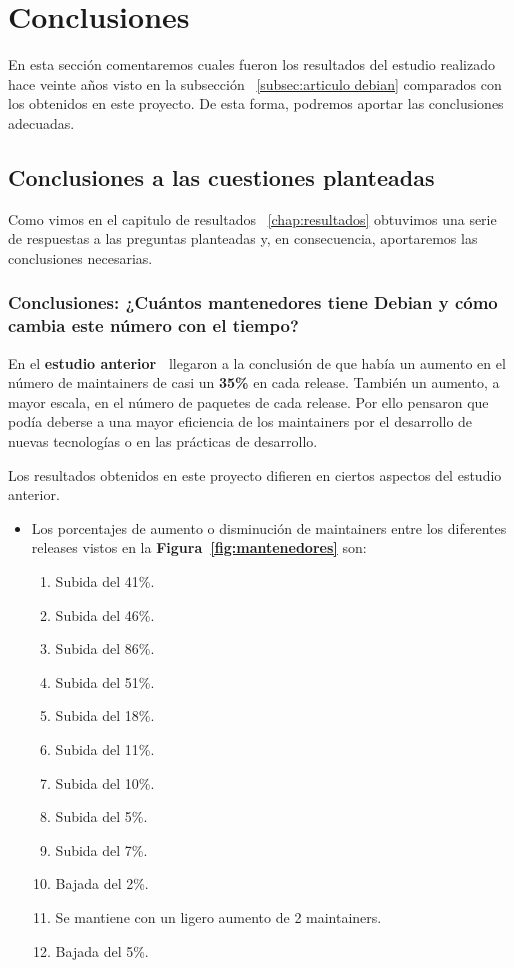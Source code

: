 \documentclass[a4paper, 12pt]{book}
\begin{document}
\cleardoublepage
\chapter{Conclusiones}
\label{chap:conclusiones}
En esta sección comentaremos cuales fueron los resultados del estudio realizado hace veinte años visto en la subsección ~\ref{subsec:articulo debian} comparados con los obtenidos en este proyecto. De esta forma, podremos aportar las conclusiones adecuadas.

\section{Conclusiones a las cuestiones planteadas}
\label{sec:conclusiones-cuestiones}
Como vimos en el capitulo de resultados ~\ref{chap:resultados} obtuvimos una serie de respuestas a las preguntas planteadas y, en consecuencia, aportaremos las conclusiones necesarias.

\subsection{Conclusiones: ¿Cuántos mantenedores tiene Debian y cómo cambia este número con el tiempo?}
\label{subsec:conclusion_1}
En el \textbf{estudio anterior~\cite{robles05:_debian}} llegaron a la conclusión de que había un aumento en el número de maintainers de casi un \textbf{35\%} en cada release. También un aumento, a mayor escala, en el número de paquetes de cada release. Por ello pensaron que podía deberse a una mayor eficiencia de los maintainers por el desarrollo de nuevas tecnologías o en las prácticas de desarrollo.

Los resultados obtenidos en este proyecto difieren en ciertos aspectos del estudio anterior.
\begin{itemize}
	\item Los porcentajes de aumento o disminución de maintainers entre los diferentes releases vistos en la \textbf{Figura~\ref{fig:mantenedores}} son: 
	\begin{enumerate}
		\item Subida del 41\%.
		\item Subida del 46\%.
		\item Subida del 86\%.
		\item Subida del 51\%.
		\item Subida del 18\%.
		\item Subida del 11\%.
		\item Subida del 10\%.
		\item Subida del 5\%.
		\item Subida del 7\%.
		\item Bajada del 2\%.
		\item Se mantiene con un ligero aumento de 2 maintainers.
		\item Bajada del 5\%.
	\end{enumerate}
\end{itemize}
\end{document}
